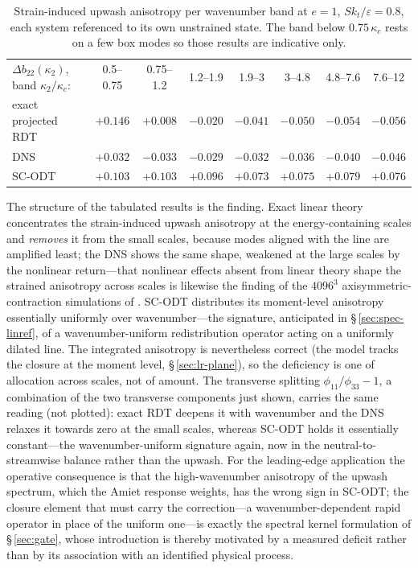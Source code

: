 \documentclass[lineno]{JFM-FLM_Au}
\begin{document}
\begin{table}
  \centering\small
  \begin{tabular}{lccccccc}
  $\Delta b_{22}(\kappa_2)$, band $\kappa_2/\kappa_c$: & 0.5--0.75 & 0.75--1.2 & 1.2--1.9 & 1.9--3 & 3--4.8 & 4.8--7.6 & 7.6--12\\[2pt]
  exact projected RDT & $+0.146$ & $+0.008$ & $-0.020$ & $-0.041$ & $-0.050$ & $-0.054$ & $-0.056$\\
  DNS                 & $+0.032$ & $-0.033$ & $-0.029$ & $-0.032$ & $-0.036$ & $-0.040$ & $-0.046$\\
  SC-ODT              & $+0.103$ & $+0.103$ & $+0.096$ & $+0.073$ & $+0.075$ & $+0.079$ & $+0.076$\\
  \end{tabular}
  \caption{Strain-induced upwash anisotropy per wavenumber band at $e=1$,
  $Sk_t/\varepsilon=0.8$, each system referenced to its own unstrained
  state. The band below $0.75\,\kappa_c$ rests on a few box modes so those results are
  indicative only.}
  \label{tab:threeway}
\end{table}

The structure of the tabulated results is the finding. Exact linear theory concentrates
the strain-induced upwash anisotropy at the energy-containing scales and
\emph{removes} it from the small scales, because modes aligned with the
line are amplified least; the DNS shows the same shape, weakened at the
large scales by the nonlinear return---that nonlinear effects absent from
linear theory shape the strained anisotropy across scales is likewise the
finding of the $4096^3$ axisymmetric-contraction simulations of
\citet{ClayYeung2016}. SC-ODT distributes
its moment-level anisotropy essentially uniformly over wavenumber---the
signature, anticipated in \S\,\ref{sec:spec-linref}, of a
wavenumber-uniform redistribution operator acting on a uniformly dilated
line. The integrated anisotropy is nevertheless correct (the model tracks
the closure at the moment level, \S\,\ref{sec:lr-plane}), so the deficiency
is one of allocation across scales, not of amount. The transverse
splitting $\phi_{11}/\phi_{33}-1$, a combination of the two transverse
components just shown, carries the same reading (not plotted): exact RDT
deepens it with wavenumber and the DNS relaxes it towards zero at the
small scales, whereas SC-ODT holds it essentially constant---the
wavenumber-uniform signature again, now in the neutral-to-streamwise
balance rather than the upwash. For the leading-edge
application the operative consequence is that the high-wavenumber
anisotropy of the upwash spectrum, which the Amiet response weights, has
the wrong sign in SC-ODT; the closure element that must carry
the correction---a wavenumber-dependent rapid operator in place of the
uniform one---is exactly the spectral kernel formulation of
\S\,\ref{sec:gate}, whose introduction is thereby motivated by a measured
deficit rather than by its association with an identified physical process.
\end{document}
